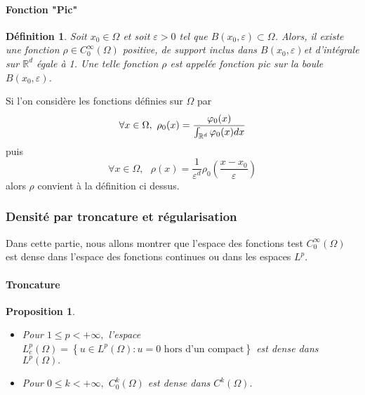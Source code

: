 \documentclass[3pt]{article}
\newtheorem{definition}[theorem]{D\'{e}finition}
\newtheorem{proposition}[theorem]{Proposition}
\begin{document}
\paragraph{Fonction "Pic"}

\bigskip 

\begin{definition}
Soit $x_{0}\in \Omega $ et soit $\varepsilon >0$ tel que $%
B(x_{0},\varepsilon )\subset \Omega $. Alors, il existe une fonction $\rho
\in C_{0}^{\infty }(\Omega )$ positive, de support inclus dans $%
B(x_{0},\varepsilon )$et d'int\'{e}grale sur $\mathbb{R}^{d}$ \'{e}gale \`{a}
1. Une telle fonction $\rho $ est appel\'{e}e fonction pic sur la boule $%
B(x_{0},\varepsilon )$.
\end{definition}

\bigskip 

Si l'on consid\`{e}re les fonctions d\'{e}finies sur $\Omega $ par%
\begin{equation*}
\forall x\in \Omega ,\text{ }\rho _{0}(x)=\frac{\varphi _{0}(x)}{\int_{%
\mathbb{R}^{d}}\varphi _{0}(x)dx}
\end{equation*}%
puis 
\begin{equation*}
\forall x\in \Omega ,\text{ }\rho (x)=\frac{1}{\varepsilon ^{d}}\rho
_{0}\left( \frac{x-x_{0}}{\varepsilon }\right) 
\end{equation*}%
alors $\rho $ convient \`{a} la d\'{e}finition ci dessus.

\subsubsection{Densit\'{e} par troncature et r\'{e}gularisation}

Dans cette partie, nous allons montrer que l'espace des fonctions test $%
C_{0}^{\infty }(\Omega )$ est dense dans l'espace des fonctions continues ou
dans les espaces $L^{p}$.

\bigskip 

\paragraph{Troncature}

\bigskip 

\begin{proposition}

\begin{itemize}
\item Pour $1\leq p<+\infty ,$ l'espace $L_{c}^{p}(\Omega )=\left\{ u\in
L^{p}(\Omega ):u=0\text{ hors d'un compact}\right\} $ est dense dans $%
L^{p}(\Omega ).$

\item Pour $0\leq k<+\infty ,$ $C_{0}^{k}(\Omega )$ est dense dans $%
C^{k}(\Omega ).$
\end{itemize}
\end{proposition}
\end{document}
